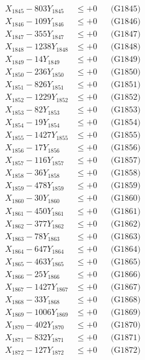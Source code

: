 \documentclass[a4paper,10pt]{article}
\begin{document}
{\begin{align}
X_{1845} - 803Y_{1845} &\leq +0 && \text{(G1845)} \\
X_{1846} - 109Y_{1846} &\leq +0 && \text{(G1846)} \\
X_{1847} - 355Y_{1847} &\leq +0 && \text{(G1847)} \\
X_{1848} - 1238Y_{1848} &\leq +0 && \text{(G1848)} \\
X_{1849} - 14Y_{1849} &\leq +0 && \text{(G1849)} \\
X_{1850} - 236Y_{1850} &\leq +0 && \text{(G1850)} \\
\allowbreak
X_{1851} - 826Y_{1851} &\leq +0 && \text{(G1851)} \\
X_{1852} - 1229Y_{1852} &\leq +0 && \text{(G1852)} \\
X_{1853} - 82Y_{1853} &\leq +0 && \text{(G1853)} \\
X_{1854} - 19Y_{1854} &\leq +0 && \text{(G1854)} \\
X_{1855} - 1427Y_{1855} &\leq +0 && \text{(G1855)} \\
X_{1856} - 17Y_{1856} &\leq +0 && \text{(G1856)} \\
X_{1857} - 116Y_{1857} &\leq +0 && \text{(G1857)} \\
X_{1858} - 36Y_{1858} &\leq +0 && \text{(G1858)} \\
X_{1859} - 478Y_{1859} &\leq +0 && \text{(G1859)} \\
X_{1860} - 30Y_{1860} &\leq +0 && \text{(G1860)} \\
\allowbreak
X_{1861} - 450Y_{1861} &\leq +0 && \text{(G1861)} \\
X_{1862} - 377Y_{1862} &\leq +0 && \text{(G1862)} \\
X_{1863} - 78Y_{1863} &\leq +0 && \text{(G1863)} \\
X_{1864} - 647Y_{1864} &\leq +0 && \text{(G1864)} \\
X_{1865} - 463Y_{1865} &\leq +0 && \text{(G1865)} \\
X_{1866} - 25Y_{1866} &\leq +0 && \text{(G1866)} \\
X_{1867} - 1427Y_{1867} &\leq +0 && \text{(G1867)} \\
X_{1868} - 33Y_{1868} &\leq +0 && \text{(G1868)} \\
X_{1869} - 1006Y_{1869} &\leq +0 && \text{(G1869)} \\
X_{1870} - 402Y_{1870} &\leq +0 && \text{(G1870)} \\
\allowbreak
X_{1871} - 832Y_{1871} &\leq +0 && \text{(G1871)} \\
X_{1872} - 127Y_{1872} &\leq +0 && \text{(G1872)} \\

\end{align}}
\end{document}
